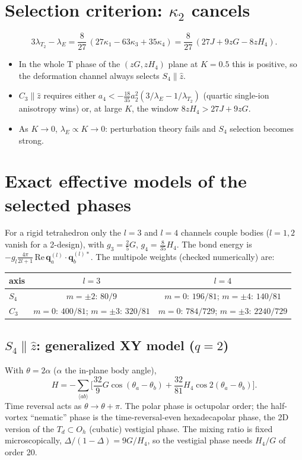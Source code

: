 \documentclass[11pt]{article}
\begin{document}
\section{Selection criterion: $\kappa_2$ cancels}
\begin{equation}
3\lambda_{T_2}-\lambda_E=\frac{8}{27}\,(27\kappa_1-63\kappa_3+35\kappa_4)
=\frac{8}{27}\,(27J+9zG-8zH_4).
\end{equation}
\begin{itemize}
\item In the whole T phase of the $(zG,zH_4)$ plane at $K=0.5$ this is positive, so the
deformation channel always selects $S_4\parallel\hat z$.
\item $C_3\parallel\hat z$ requires either $a_4<-\frac{18}{35}a_2^2(3/\lambda_E-1/\lambda_{T_2})$
(quartic single-ion anisotropy wins) or, at large $K$, the window $8zH_4>27J+9zG$.
\item As $K\to0$, $\lambda_E\propto K\to0$: perturbation theory fails and $S_4$ selection
becomes strong.
\end{itemize}

\section{Exact effective models of the selected phases}
For a rigid tetrahedron only the $l=3$ and $l=4$ channels couple bodies ($l=1,2$ vanish for a
2-design), with $g_3=\frac25G$, $g_4=\frac{8}{35}H_4$. The bond energy is
$-g_l\frac{4\pi}{2l+1}\,\mathrm{Re}\,\mathbf q^{(l)}_a\cdot\mathbf q^{(l)*}_b$.
The multipole weights (checked numerically) are:
\begin{center}
\begin{tabular}{lcc}
\toprule
axis & $l=3$ & $l=4$\\
\midrule
$S_4$ & $m=\pm2$: $80/9$ & $m=0$: $196/81$; $m=\pm4$: $140/81$\\
$C_3$ & $m=0$: $400/81$; $m=\pm3$: $320/81$ & $m=0$: $784/729$; $m=\pm3$: $2240/729$\\
\bottomrule
\end{tabular}
\end{center}

\subsection*{$S_4\parallel\hat z$: generalized XY model ($q=2$)}
With $\theta=2\alpha$ ($\alpha$ the in-plane body angle),
\begin{equation}
H=-\sum_{\langle ab\rangle}\Big[\frac{32}{9}G\cos(\theta_a-\theta_b)+\frac{32}{81}H_4\cos2(\theta_a-\theta_b)\Big].
\end{equation}
Time reversal acts as $\theta\to\theta+\pi$. The polar phase is octupolar order; the
half-vortex ``nematic'' phase is the time-reversal-even hexadecapolar phase, the 2D version
of the $T_d\subset O_h$ (cubatic) vestigial phase. The mixing ratio is fixed microscopically,
$\Delta/(1-\Delta)=9G/H_4$, so the vestigial phase needs $H_4/G$ of order 20.
\end{document}
